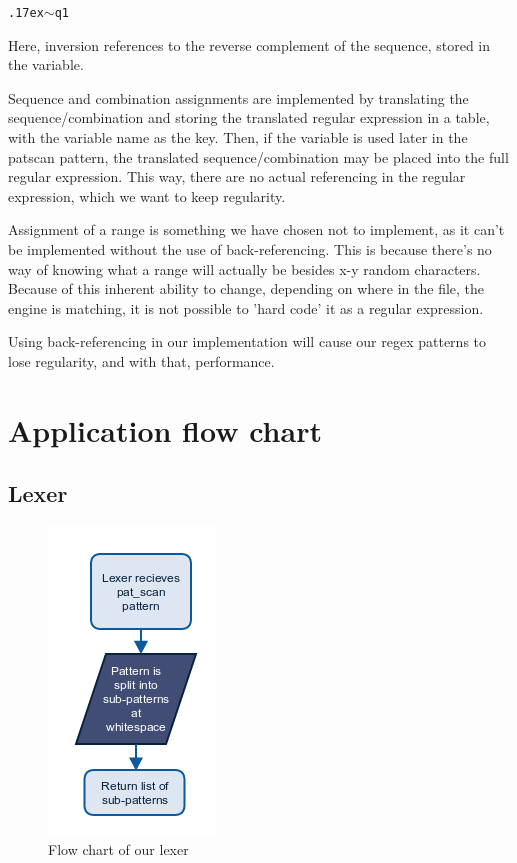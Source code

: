 \documentclass[12pt]{article}
\begin{document}
\texttt{{\raise.17ex\hbox{$\scriptstyle\mathtt{\sim}$}}q1}

Here, inversion references to the reverse complement of the sequence, stored in the variable.

Sequence and combination assignments are implemented by translating the sequence/combination and storing the translated regular expression in a table, with the variable name as the key. Then, if the variable is used later in the patscan pattern, the translated sequence/combination may be placed into the full regular expression. This way, there are no actual referencing in the regular expression, which we want to keep regularity.

Assignment of a range is something we have chosen not to implement, as it can't be implemented without the use of back-referencing. This is because there's no way of knowing what a range will actually be besides x-y random characters. Because of this inherent ability to change, depending on where in the file, the engine is matching, it is not possible to 'hard code' it as a regular expression.

Using back-referencing in our implementation will cause our regex patterns to lose regularity, and with that, performance.


\section{Application flow chart}

\subsection{Lexer}
\begin{figure}[H]
	\begin{center}
		\includegraphics[scale=1]{lexer.png}
	\end{center}
	\caption{Flow chart of our lexer}
\end{figure}
\end{document}
